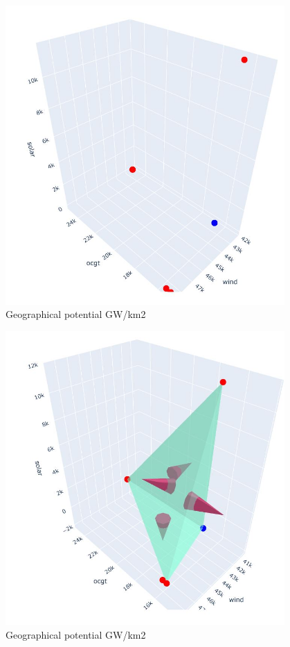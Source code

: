 \begin{figure}[H]\centering
	\includegraphics[width=0.95\textwidth]{./Images/step2}
	\caption{Geographical potential GW/km2}
	\label{fig:step2}
\end{figure}

\begin{figure}[H]\centering
	\includegraphics[width=0.95\textwidth]{./Images/step3}
	\caption{Geographical potential GW/km2}
	\label{fig:step3}
\end{figure}

